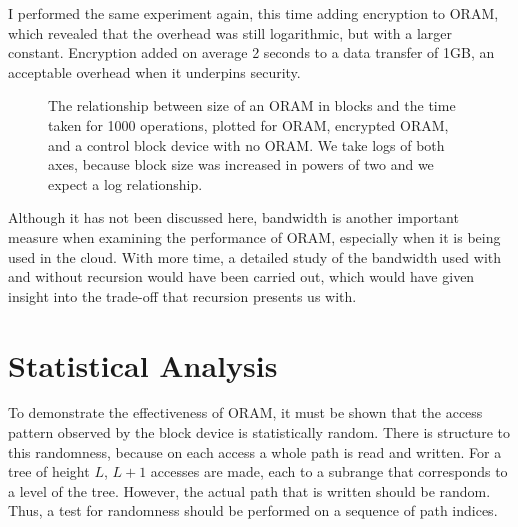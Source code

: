 \documentclass[12pt,a4paper,twoside,openright]{report}
\begin{document}
I performed the same experiment again, this time adding encryption to ORAM, which revealed that the overhead was still logarithmic, but with a larger constant. Encryption added on average 2 seconds to a data transfer of 1GB, an acceptable overhead when it underpins security.

\begin{figure}
    \centering
    
    \caption{The relationship between size of an ORAM in blocks and the time taken for 1000 operations, plotted for ORAM, encrypted ORAM, and a control block device with no ORAM. We take logs of both axes, because block size was increased in powers of two and we expect a log relationship.}
    \label{fig:timeResults}
\end{figure}



Although it has not been discussed here, bandwidth is another important measure when examining the performance of ORAM, especially when it is being used in the cloud. With more time, a detailed study of the bandwidth used with and without recursion would have been carried out, which would have given insight into the trade-off that recursion presents us with.

\section{Statistical Analysis}
\label{sec:statisticalAnalysis}

To demonstrate the effectiveness of ORAM, it must be shown that the access pattern observed by the block device is statistically random. There is structure to this randomness, because on each access a whole path is read and written. For a tree of height $L$, $L+1$ accesses are made, each to a subrange that corresponds to a level of the tree. However, the actual path that is written should be random. Thus, a test for randomness should be performed on a sequence of path indices.
\end{document}
